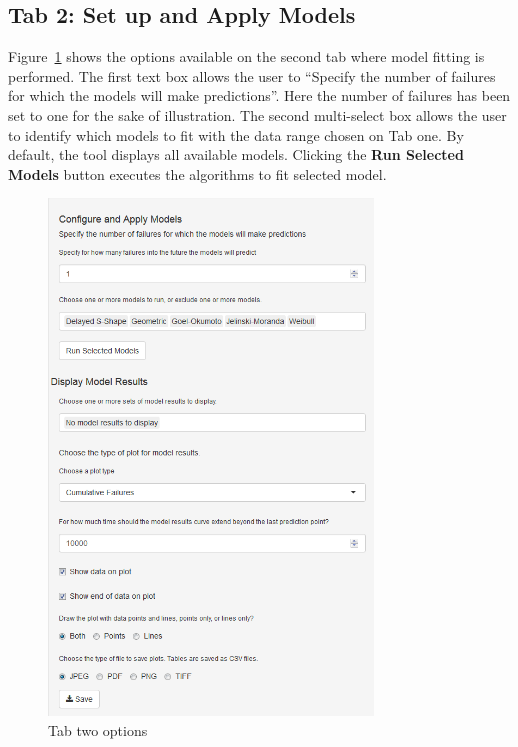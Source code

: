 \documentclass[journal]{IEEEtran}
\begin{document}



\subsection{Tab 2: Set up and Apply Models}\label{tab2}
Figure~\ref{fig_Tab2} shows the options available on the second tab where model fitting is performed. The first text box allows the user to ``Specify the number of failures for which the models will make predictions''. Here the number of failures has been set to one for the sake of illustration. The second multi-select box allows the user to identify which models to fit with the data range chosen on Tab one. By default, the tool displays all available models. Clicking the \textbf{Run Selected Models} button executes the algorithms to fit selected model.

\begin{figure}[!h]
\centering%
\includegraphics[width=3.4in]{Figures/Fig8}
\caption{Tab two options}
\label{fig_Tab2}
\end{figure}
\end{document}
